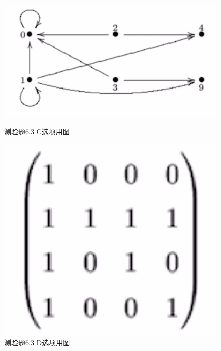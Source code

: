 \documentclass[UTF8, heading=true]{ctexart}
\begin{document}
\begin{figure}[htbp]
    \centering
    \begin{minipage}[t]{0.45\textwidth}
        \centering
        \includegraphics[width=1\textwidth]{6.3_1.jpg} %
	      \vspace{-0.3cm}
        \caption{测验题6.3 C选项用图}
    \end{minipage}
	  \hspace{0.1\textwidth} %
    \begin{minipage}[t]{0.23\textwidth}
        \centering
        \includegraphics[width=1\textwidth]{6.3_2.jpg} %
	      \vspace{-0.3cm}
        \caption{测验题6.3 D选项用图}
\end{minipage}
\end{figure}
\end{document}
